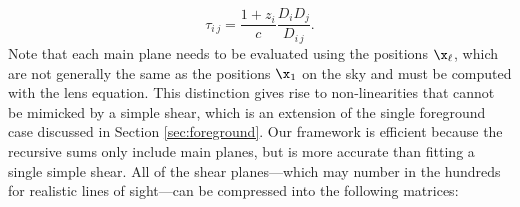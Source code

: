 \begin{equation}
\tau_{i\,j} = \frac{ 1 + z_i}{c} \frac{D_i D_j}{D_{i\,j}}.
\end{equation}
Note that each main plane needs to be evaluated using the positions $\x_\ell$, which are not generally the same as the positions $\x_1$ on the sky and must be computed with the lens equation. This distinction gives rise to non-linearities that cannot be mimicked by a simple shear, which is an extension of the single foreground case discussed in Section \ref{sec:foreground}. Our framework is efficient because the recursive sums only include main planes, but is more accurate than fitting a single simple shear. All of the shear planes---which may number in the hundreds for realistic lines of sight---can be compressed into the following matrices: